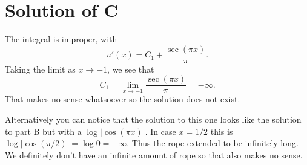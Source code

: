 \documentclass[10pt]{article}
\theoremstyle{definition}
\begin{document}
\section{Solution of C}
The integral is improper, with
$$u'(x) = C_1 + \frac{\sec(\pi x)}{\pi}.$$
Taking the limit as $x \to -1$, we see that
$$C_1 = \lim_{x \to -1} \frac{\sec(\pi x)}{\pi} = -\infty.$$
That makes no sense whatsoever so the solution does not exist.

Alternatively you can notice that the solution to this one looks like the solution to part B but with a $\log|\cos(\pi x)|$.
In case $x = 1/2$ this is $\log|\cos(\pi/2)| = \log 0 = -\infty$. Thus the rope extended to be infinitely long.
We definitely don't have an infinite amount of rope so that also makes no sense.
\end{document}
